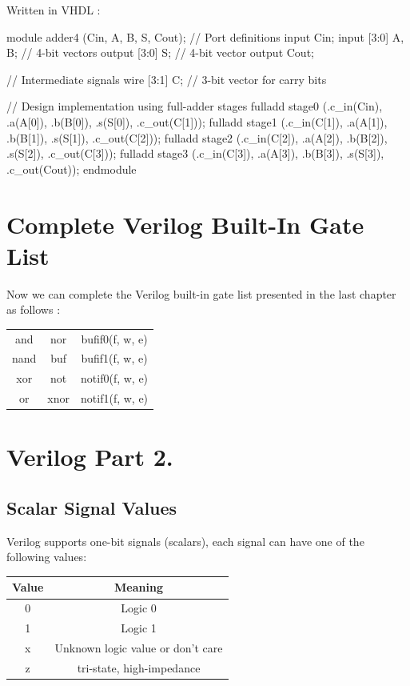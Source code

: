 \documentclass[12pt,openany, tikz,border=10pt]{book}
\begin{document}
			      	Written in VHDL : 
			      	\begin{vhdl}
module adder4 (Cin, A, B, S, Cout);
// Port definitions
input Cin;
input [3:0] A, B; // 4-bit vectors
output [3:0] S;   // 4-bit vector
output Cout;

// Intermediate signals
wire [3:1] C; // 3-bit vector for carry bits

// Design implementation using full-adder stages
fulladd stage0 (.c_in(Cin), .a(A[0]), .b(B[0]), .s(S[0]), .c_out(C[1]));
fulladd stage1 (.c_in(C[1]), .a(A[1]), .b(B[1]), .s(S[1]), .c_out(C[2]));
fulladd stage2 (.c_in(C[2]), .a(A[2]), .b(B[2]), .s(S[2]), .c_out(C[3]));
fulladd stage3 (.c_in(C[3]), .a(A[3]), .b(B[3]), .s(S[3]), .c_out(Cout));
endmodule
			      	\end{vhdl}
			      	
			      	
					
			      	

					
\section{Complete Verilog Built-In Gate List}
Now we can complete the Verilog built-in gate list presented in the last chapter as follows :
\begin{center}
	\begin{tabular}{c|c|c}
		and  & nor & bufif0(f, w, e)  \\
		nand & buf & bufif1(f, w, e)  \\
		xor  & not & notif0(f, w, e) \\
		or   & xnor & notif1(f, w, e) \\
	\end{tabular}

\end{center}



\section{Verilog Part 2.}

\subsection{Scalar Signal Values}
Verilog supports one-bit signals (scalars), each signal can have one of the following values:
\begin{center}
	\begin{tabular}{cc}
	\hline
	Value & Meaning \\
	\hline
	0 & Logic 0 \\
	1 & Logic 1 \\
	x & Unknown logic value or don't care \\
	z & tri-state, high-impedance \\
	\hline
\end{tabular}
\end{center}
\end{document}
